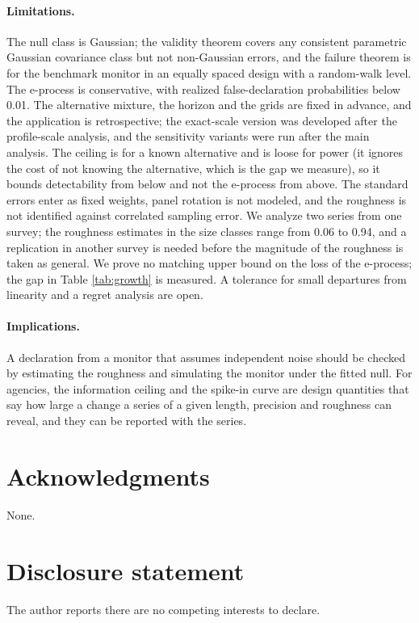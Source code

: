 \documentclass[11pt]{article}
\theoremstyle{plain}
\theoremstyle{definition}
\begin{document}
\paragraph{Limitations.} The null class is Gaussian; the validity theorem covers any consistent parametric Gaussian covariance class but not non-Gaussian errors, and the failure theorem is for the benchmark monitor in an equally spaced design with a random-walk level. The e-process is conservative, with realized false-declaration probabilities below 0.01. The alternative mixture, the horizon and the grids are fixed in advance, and the application is retrospective; the exact-scale version was developed after the profile-scale analysis, and the sensitivity variants were run after the main analysis. The ceiling is for a known alternative and is loose for power (it ignores the cost of not knowing the alternative, which is the gap we measure), so it bounds detectability from below and not the e-process from above. The standard errors enter as fixed weights, panel rotation is not modeled, and the roughness is not identified against correlated sampling error. We analyze two series from one survey; the roughness estimates in the size classes range from 0.06 to 0.94, and a replication in another survey is needed before the magnitude of the roughness is taken as general. We prove no matching upper bound on the loss of the e-process; the gap in Table \ref{tab:growth} is measured. A tolerance for small departures from linearity and a regret analysis are open.

\paragraph{Implications.} A declaration from a monitor that assumes independent noise should be checked by estimating the roughness and simulating the monitor under the fitted null. For agencies, the information ceiling and the spike-in curve are design quantities that say how large a change a series of a given length, precision and roughness can reveal, and they can be reported with the series.

\section*{Acknowledgments}
None.

\section*{Disclosure statement}
The author reports there are no competing interests to declare.
\end{document}
